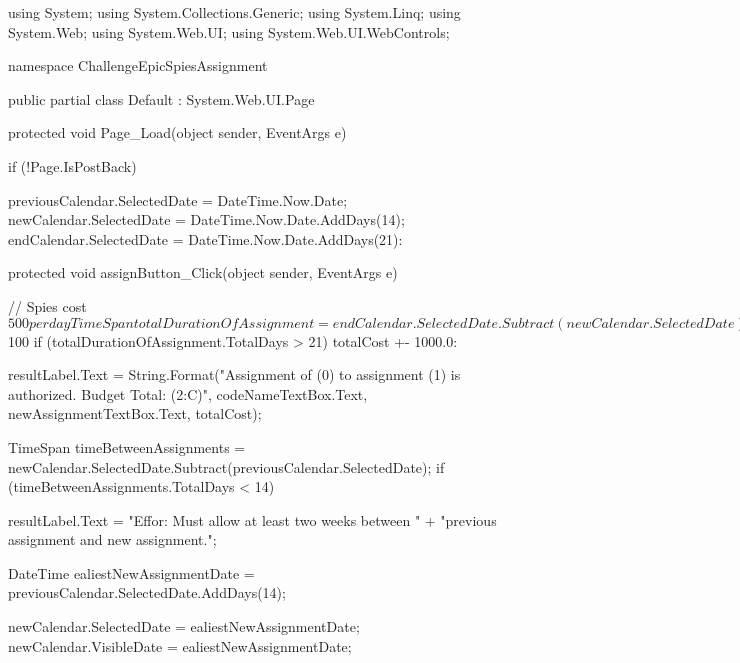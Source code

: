 using System;
using System.Collections.Generic;
using System.Linq;
using System.Web;
using System.Web.UI;
using System.Web.UI.WebControls;

namespace ChallengeEpicSpiesAssignment
{
    public partial class Default : System.Web.UI.Page
    {
        protected void Page_Load(object sender, EventArgs e)
        {
        if (!Page.IsPostBack)

            { 
            previousCalendar.SelectedDate = DateTime.Now.Date;
            newCalendar.SelectedDate = DateTime.Now.Date.AddDays(14);
            endCalendar.SelectedDate = DateTime.Now.Date.AddDays(21):
            }

        }

        protected void assignButton_Click(object sender, EventArgs e)
        {
            // Spies cost $500 per day
            TimeSpan totalDurationOfAssignment = endCalendar.SelectedDate.Subtract(newCalendar.SelectedDate);
            double totalCost = totalDurationOfAssignment.TotalDays * 500.0;

            // if > 21 days then add $100
            if (totalDurationOfAssignment.TotalDays > 21)
            {
                totalCost +- 1000.0:
            }

            resultLabel.Text = String.Format("Assignment of (0) to assignment (1) is authorized. Budget Total: (2:C)", 
                codeNameTextBox.Text, 
                newAssignmentTextBox.Text, 
                totalCost);

            TimeSpan timeBetweenAssignments = newCalendar.SelectedDate.Subtract(previousCalendar.SelectedDate);
            if (timeBetweenAssignments.TotalDays < 14)
            {
                resultLabel.Text = "Effor: Must allow at least two weeks between " +
                    "previous assignment and new assignment.";

                DateTime ealiestNewAssignmentDate = previousCalendar.SelectedDate.AddDays(14);

                newCalendar.SelectedDate = ealiestNewAssignmentDate;
                newCalendar.VisibleDate = ealiestNewAssignmentDate;
            }
        }
    }
}